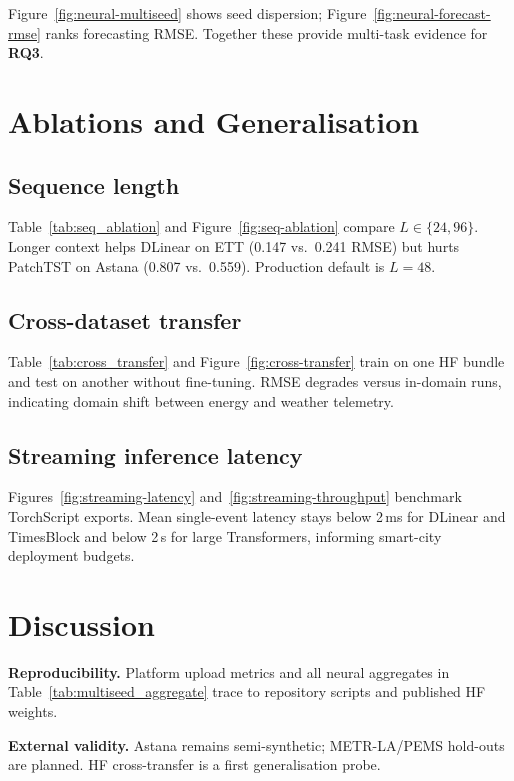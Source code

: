 Figure~\ref{fig:neural-multiseed} shows seed dispersion; Figure~\ref{fig:neural-forecast-rmse} ranks forecasting RMSE. Together these provide multi-task evidence for \textbf{RQ3}.



\section{Ablations and Generalisation}
\label{sec:ablations}

\subsection{Sequence length}

Table~\ref{tab:seq_ablation} and Figure~\ref{fig:seq-ablation} compare $L\in\{24,96\}$. Longer context helps DLinear on ETT (0.147 vs.\ 0.241 RMSE) but hurts PatchTST on Astana (0.807 vs.\ 0.559). Production default is $L=48$.

\subsection{Cross-dataset transfer}

Table~\ref{tab:cross_transfer} and Figure~\ref{fig:cross-transfer} train on one HF bundle and test on another without fine-tuning. RMSE degrades versus in-domain runs, indicating domain shift between energy and weather telemetry.

\subsection{Streaming inference latency}

Figures~\ref{fig:streaming-latency} and~\ref{fig:streaming-throughput} benchmark TorchScript exports. Mean single-event latency stays below 2\,ms for DLinear and TimesBlock and below 2\,s for large Transformers, informing smart-city deployment budgets.

\section{Discussion}
\label{sec:discussion}

\textbf{Reproducibility.} Platform upload metrics and all neural aggregates in Table~\ref{tab:multiseed_aggregate} trace to repository scripts and published HF weights.

\textbf{External validity.} Astana remains semi-synthetic; METR-LA/PEMS hold-outs are planned. HF cross-transfer is a first generalisation probe.

